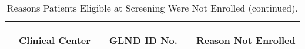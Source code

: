 \documentclass[dvips, 10pt]{article}
\begin{document}
\begin{table}[t]
\caption
{ Reasons Patients Eligible at Screening Were Not Enrolled (continued). }
\begin{center}
\begin{tabular}{ @{}l@{}
@{}l@{}@{}p{1.5em}@{}@{}c@{}@{}p{1.5em}@{}@{}l@{}
}
\hline

& \parbox{6em}{\begin{center}Clinical Center\end{center}} && \parbox{6em}{\begin{center}GLND ID No.\end{center}} && \parbox{6em}{\begin{center}Reason Not Enrolled\end{center}} \\

\hline


\end{tabular}
\end{center}
\end{table}
\end{document}
